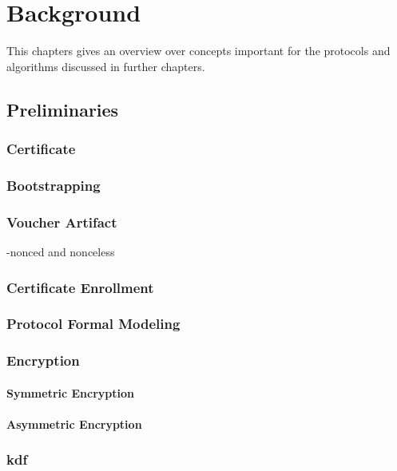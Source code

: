 \chapter{Background}
\label{ch:background}

This chapters gives an overview over concepts important for the protocols and algorithms discussed in further chapters.
\section{Preliminaries}

\subsection{Certificate}

\subsection{Bootstrapping}

\subsection{Voucher Artifact}
-nonced and nonceless

\subsection{Certificate Enrollment}

\subsection{Protocol Formal Modeling}

\subsection{Encryption}
	\subsubsection{Symmetric Encryption}
	\subsubsection{Asymmetric Encryption}
	
\subsection{\acrfull*{kdf}} \label{backgroung:kdf}

